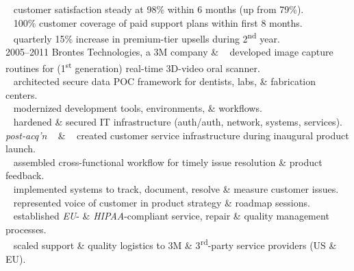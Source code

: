 \documentclass[]{friggeri-cv} %
\begin{document}
\begin{entrylist}
{{\tiny {}} ~ customer satisfaction steady at 98\% within 6 months (up from 79\%).\\
{\tiny {}} ~ 100\% customer coverage of paid support plans within first 8 months.\\
{\tiny {}} ~ quarterly 15\% increase in premium-tier upsells during 2\textsuperscript{nd} year.\\}
\entry
{2005--2011}
{Brontes Technologies, a 3M company}
{ \& }
{{\tiny {}} ~ developed image capture routines for (1\textsuperscript{st} generation) real-time 3D-video oral scanner.\\
{\tiny {}} ~ architected secure data POC framework for dentists, labs, \& fabrication centers.\\
{\tiny {}} ~ modernized development tools, environments, \& workflows.\\
{\tiny {}} ~ hardened \& secured IT infrastructure (auth/auth, network, systems, services).}
\entry
{\emph{post-acq'n}}
{~}
{ \& }
{{\tiny {}} ~ created customer service infrastructure during inaugural product launch.\\
{\tiny {}} ~ assembled cross-functional workflow for timely issue resolution \& product feedback.\\
{\tiny {}} ~ implemented systems to track, document, resolve \& measure customer issues.\\

{\tiny {}} ~ represented voice of customer in product strategy \& roadmap sessions.\\
{\tiny {}} ~ established \emph{EU}- \& \emph{HIPAA}-compliant service, repair \& quality management processes.\\
{\tiny {}} ~ scaled support \& quality logistics to 3M \& 3\textsuperscript{rd}-party service providers (US \& EU).\\

}
\end{entrylist}
\end{document}
